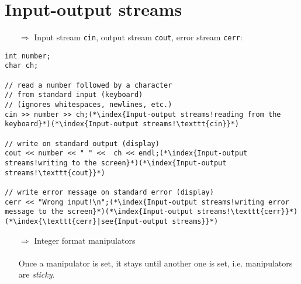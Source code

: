 \documentclass[10pt]{article}
\begin{document}
\section{Input-output streams}
\small
\begin{enumerate}
\item[$\Rightarrow$] Input stream \texttt{cin}, output stream \texttt{cout}, error stream \texttt{cerr}:
\end{enumerate}
\begin{lstlisting}
int number;
char ch;

// read a number followed by a character
// from standard input (keyboard)
// (ignores whitespaces, newlines, etc.)
cin >> number >> ch;(*\index{Input-output streams!reading from the keyboard}*)(*\index{Input-output streams!\texttt{cin}}*)

// write on standard output (display)
cout << number << " " <<  ch << endl;(*\index{Input-output streams!writing to the screen}*)(*\index{Input-output streams!\texttt{cout}}*)

// write error message on standard error (display)
cerr << "Wrong input!\n";(*\index{Input-output streams!writing error message to the screen}*)(*\index{Input-output streams!\texttt{cerr}}*)(*\index{\texttt{cerr}|see{Input-output streams}}*)
\end{lstlisting}
\begin{enumerate}
\item[$\Rightarrow$] Integer format manipulators\\ \\ Once a  manipulator is set, it stays until another one is set, i.e. manipulators are \emph{sticky}.
\end{enumerate}
\end{document}
